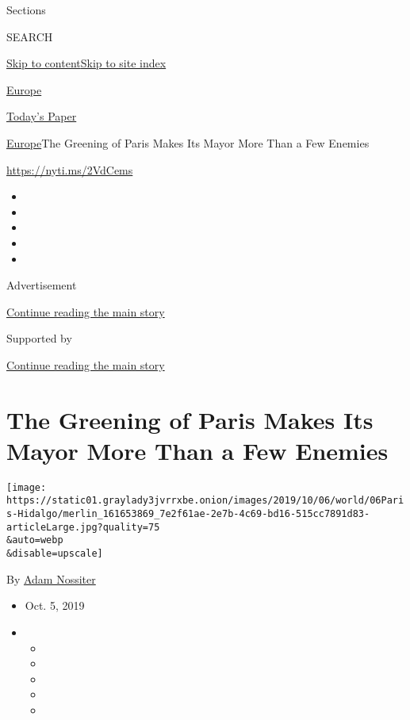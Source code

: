 Sections

SEARCH

\protect\hyperlink{site-content}{Skip to
content}\protect\hyperlink{site-index}{Skip to site index}

\href{https://www.nytimes3xbfgragh.onion/section/world/europe}{Europe}

\href{https://myaccount.nytimes3xbfgragh.onion/auth/login?response_type=cookie\&client_id=vi}{}

\href{https://www.nytimes3xbfgragh.onion/section/todayspaper}{Today's
Paper}

\href{/section/world/europe}{Europe}\textbar{}The Greening of Paris
Makes Its Mayor More Than a Few Enemies

\url{https://nyti.ms/2VdCems}

\begin{itemize}
\item
\item
\item
\item
\item
\end{itemize}

Advertisement

\protect\hyperlink{after-top}{Continue reading the main story}

Supported by

\protect\hyperlink{after-sponsor}{Continue reading the main story}

\hypertarget{the-greening-of-paris-makes-its-mayor-more-than-a-few-enemies}{%
\section{The Greening of Paris Makes Its Mayor More Than a Few
Enemies}\label{the-greening-of-paris-makes-its-mayor-more-than-a-few-enemies}}

\texttt{[image: https://static01.graylady3jvrrxbe.onion/images/2019/10/06/world/06Paris-Hidalgo/merlin\_161653869\_7e2f61ae-2e7b-4c69-bd16-515cc7891d83-articleLarge.jpg?quality=75\\\&auto=webp\\\&disable=upscale]}

By \href{https://www.nytimes3xbfgragh.onion/by/adam-nossiter}{Adam
Nossiter}

\begin{itemize}
\item
  Oct. 5, 2019
\item
  \begin{itemize}
  \item
  \item
  \item
  \item
  \item
  \end{itemize}
\end{itemize}

